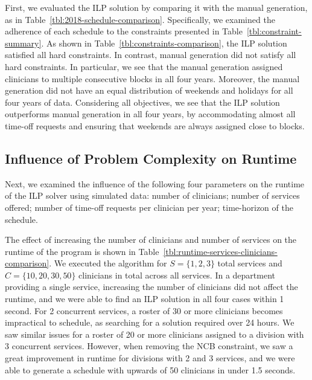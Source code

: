 First, we evaluated the ILP solution by comparing it with the
manual generation, as in Table~\ref{tbl:2018-schedule-comparison}. Specifically, we examined the adherence of each
schedule to the constraints presented in Table~\ref{tbl:constraint-summary}. As
shown in Table~\ref{tbl:constraints-comparison}, the ILP solution satisfied all 
hard constraints. In contrast,
manual generation did not satisfy all hard constraints. In
particular, we see that the manual generation assigned clinicians to multiple
consecutive blocks in all four years. Moreover, the manual generation did not have
an equal distribution of weekends and holidays for all four years of data.
Considering all objectives, we see that the ILP solution outperforms manual generation
in all four years, by accommodating almost all time-off requests and
ensuring that weekends are always assigned close to blocks.



\subsection{Influence of Problem Complexity on Runtime}
Next, we examined the influence of the following four parameters on the
runtime of the ILP solver using simulated data:
number of clinicians;
number of services offered;
number of time-off requests per clinician per year;
time-horizon of the schedule.

The effect of increasing the number of clinicians and number of services %
on the runtime of the program is shown in Table~\ref{tbl:runtime-services-clinicians-comparison}.
We executed the algorithm for
$S = \{1, 2, 3\}$ total services and $C = \{10, 20, 30, 50\}$ clinicians in
total across all services. 
In a department providing a single service, increasing the number of clinicians
did not affect the runtime, and we were able to find an ILP solution in all four cases
within 1 second.
For 2 concurrent services, a roster of 30 or more
clinicians becomes impractical to schedule, as searching for a solution required
over 24 hours. We saw similar issues for a roster of 20 or more clinicians
assigned to a division with 3 concurrent services. However, when removing the
NCB constraint, we saw a great improvement in runtime for divisions with 2 and 3
services, and we were able to generate a schedule with upwards of 50 clinicians
in under 1.5 seconds.  %


